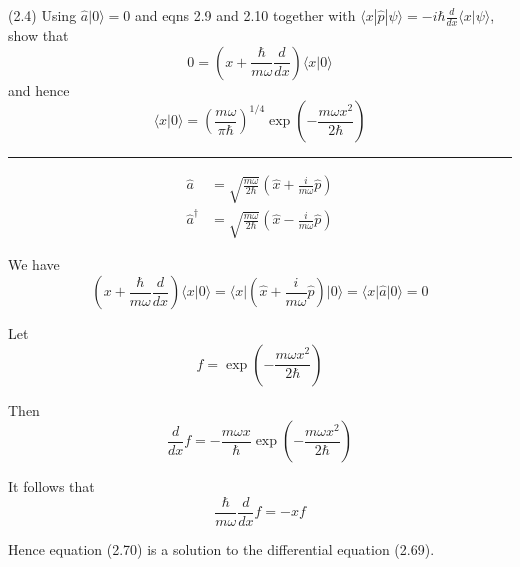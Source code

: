 \documentclass[12pt]{article}
\begin{document}
(2.4)
Using $\hat a|0\rangle=0$ and eqns 2.9 and 2.10 together with
$\langle x|\hat p|\psi\rangle=-i\hbar\frac{d}{dx}\langle x|\psi\rangle$, show that
\begin{equation*}
0=\left(x+\frac{\hbar}{m\omega}\frac{d}{dx}\right)
\langle x|0\rangle
\tag{2.69}
\end{equation*}
and hence
\begin{equation*}
\langle x|0\rangle=\left(\frac{m\omega}{\pi\hbar}\right)^{1/4}
\exp\left(-\frac{m\omega x^2}{2\hbar}\right)
\tag{2.70}
\end{equation*}

\hrule

\begin{align*}
\hat a&=\sqrt{\frac{m\omega}{2\hbar}}
\left(\hat x+\frac{i}{m\omega}\hat p\right)
\tag{2.9}
\\
\hat a^\dag&=\sqrt{\frac{m\omega}{2\hbar}}
\left(\hat x-\frac{i}{m\omega}\hat p\right)
\tag{2.10}
\end{align*}

We have
\begin{equation*}
\left(x+\frac{\hbar}{m\omega}\frac{d}{dx}\right)\langle x|0\rangle
=\langle x|\left(\hat x+\frac{i}{m\omega}\hat p\right)|0\rangle
=\langle x|\hat a|0\rangle
=0
\end{equation*}

Let
\begin{equation*}
f=\exp\left(-\frac{m\omega x^2}{2\hbar}\right)
\end{equation*}

Then
\begin{equation*}
\frac{d}{dx}f=-\frac{m\omega x}{\hbar}\exp\left(-\frac{m\omega x^2}{2\hbar}\right)
\end{equation*}

It follows that
\begin{equation*}
\frac{\hbar}{m\omega}\frac{d}{dx}f=-xf
\end{equation*}

Hence equation (2.70) is a solution to the differential equation (2.69).
\end{document}
